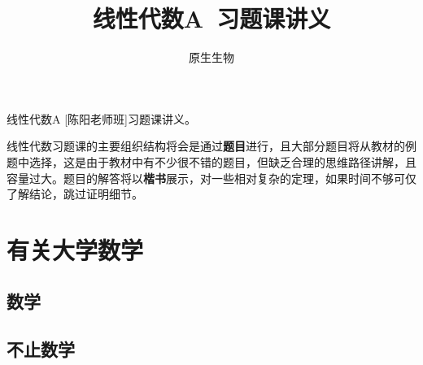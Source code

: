 \documentclass[a4paper,UTF8,fontset=windows,AutoFakeBold]{ctexart}
\title{\textbf{线性代数A\ 习题课讲义}}
\author{原生生物}
\date{}
\newcommand*{\note}{\noindent *}
\theoremstyle{ex}
\begin{document}
\maketitle

\note 线性代数A [陈阳老师班]习题课讲义。

\note 线性代数习题课的主要组织结构将会是通过\textbf{题目}进行，且大部分题目将从教材的例题中选择，这是由于教材中有不少很不错的题目，但缺乏合理的思维路径讲解，且容量过大。题目的解答将以{\kaishu\textbf{楷书}}展示，对一些相对复杂的定理，如果时间不够可仅了解结论，跳过证明细节。

\tableofcontents

\newpage
\section{有关大学数学}
\subsection{数学}
\subsection{不止数学}
\end{document}
